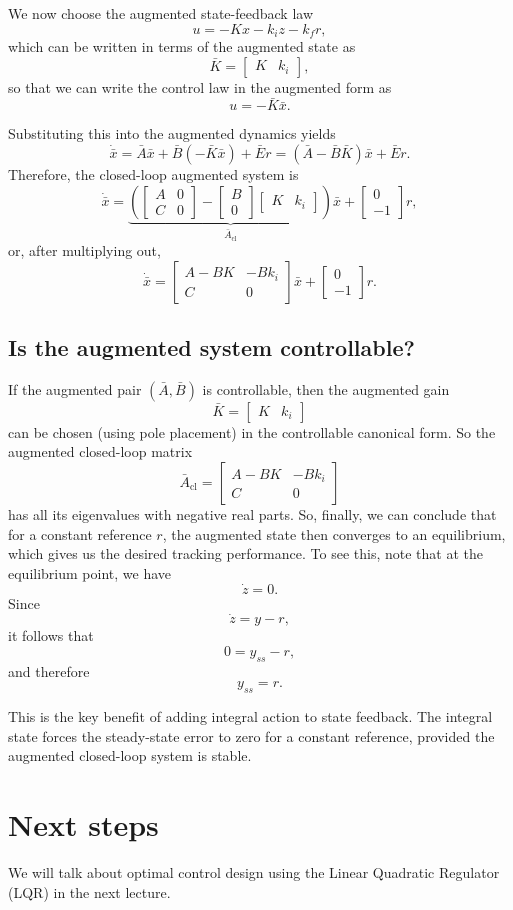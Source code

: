 \documentclass{ee122_notes}
\begin{document}
We now choose the augmented state-feedback law
\[
u=-Kx-k_i z - k_f r,
\]
which can be written in terms of the augmented state as
\[
\bar{K}=
\begin{bmatrix}
K & k_i
\end{bmatrix},
\]
so that we can write the control law in the augmented form as \[
u=-\bar{K} \bar{x}.
\]

Substituting this into the augmented dynamics yields
\[
\dot{\bar{x}}
=
\bar{A}\bar{x} + \bar{B}(-\bar{K} \bar{x})+\bar{E} r
=
(\bar{A}-\bar{B}\bar{K})\bar{x}+\bar{E} r.
\]
Therefore, the closed-loop augmented system is
\[
\dot{\bar{x}}
=
\underbrace{
\left(
\begin{bmatrix}
A & 0\\
C & 0
\end{bmatrix}
-
\begin{bmatrix}
B\\
0
\end{bmatrix}
\begin{bmatrix}
K & k_i
\end{bmatrix}
\right)}_{\bar{A}_{\mathrm{cl}}}
\bar{x}
+
\begin{bmatrix}
0\\
-1
\end{bmatrix}r,
\]
or, after multiplying out,
\[
\dot{\bar{x}}
=
\begin{bmatrix}
A-BK & -Bk_i\\
C & 0
\end{bmatrix}\bar{x}
+
\begin{bmatrix}
0\\
-1
\end{bmatrix}r.
\]
\subsection{Is the augmented system controllable?}
If the augmented pair \((\bar{A},\bar{B})\) is controllable, then the augmented gain
\[
\bar{K}=
\begin{bmatrix}
K & k_i
\end{bmatrix}
\]
can be chosen (using pole placement) in the controllable canonical form. So the augmented closed-loop matrix
\[
\bar{A}_{\mathrm{cl}}
=
\begin{bmatrix}
A-BK & -Bk_i\\
C & 0
\end{bmatrix}
\]
has all its eigenvalues with negative real parts. So, finally, we can conclude that for a constant reference \(r\), the augmented state then converges to an equilibrium, which gives us the desired tracking performance. To see this, note that at the equilibrium point, we have
\[
\dot z = 0.
\]
Since
\[
\dot z = y-r,
\]
it follows that
\[
0=y_{ss}-r,
\]
and therefore
\[
y_{ss}=r.
\]

This is the key benefit of adding integral action to state feedback. The integral state forces the steady-state error to zero for a constant reference, provided the augmented closed-loop system is stable.

\section{Next steps}
We will talk about optimal control design using the Linear Quadratic Regulator (LQR) in the next lecture. 
\end{document}
